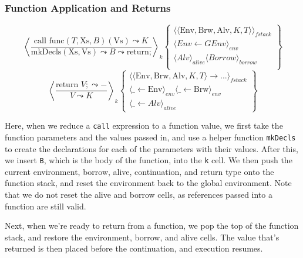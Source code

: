 \documentclass[review,twocolumn]{sigplanconf}
\begin{document}
\subsubsection*{Function Application and Returns}
\begin{scriptsize}
  \[
    \left\langle
    \frac{ \text{call func}(T, \text{Xs}, B)(\text{Vs}) \leadsto K }{ \text{mkDecls}(\text{Xs}, \text{Vs}) \leadsto B \leadsto \text{return;} }
    \right\rangle _k
    \left\{
    \begin{array}{l}
      \langle \langle \text{Env}, \text{Brw}, \text{Alv}, K, T \rangle\rangle_{fstack} \\
      \langle Env \leftarrow GEnv\rangle_{env}                                         \\
      \langle Alv \rangle_{alive} \langle Borrow \rangle_{borrow}                      \\
    \end{array}
    \right\}
  \]
  \[
    \left\langle
    \frac{ \text{return } V; \leadsto - }{ V \leadsto K }
    \right\rangle _k
    \left\{
    \begin{array}{l}
      \langle \langle \text{Env}, \text{Brw}, \text{Alv}, K, T \rangle \rightarrow ...\rangle_{fstack} \\
      \langle \_ \leftarrow \text{Env} \rangle_ {env} \langle \_ \leftarrow \text{Brw} \rangle_ {env}  \\
      \langle \_ \leftarrow Alv \rangle_{alive}
    \end{array}
    \right\}
  \]
\end{scriptsize}

Here, when we reduce a \verb!call! expression to a function value, we first take the function parameters and the values passed in, and use a helper function \verb!mkDecls! to create the declarations for each of the parameters with their values. After this, we insert \verb!B!, which is the body of the function, into the \verb!k! cell. We then push the current environment, borrow, alive, continuation, and return type onto the function stack, and reset the environment back to the global environment. Note that we do not reset the alive and borrow cells, as references passed into a function are still valid.

Next, when we're ready to return from a function, we pop the top of the function stack, and restore the environment, borrow, and alive cells. The value that's returned is then placed before the continuation, and execution resumes.
\end{document}
